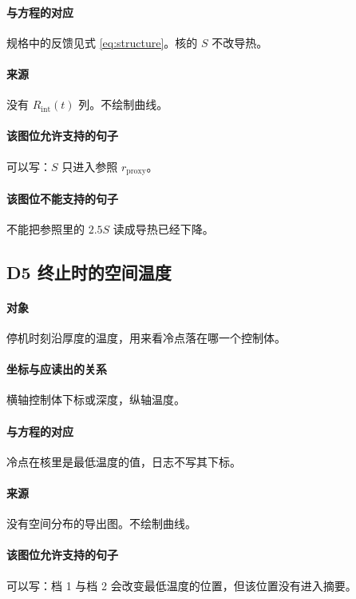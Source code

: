 \paragraph{与方程的对应}
规格中的反馈见式 \eqref{eq:structure}。核的 $S$ 不改导热。

\paragraph{来源}
没有 $R_{\mathrm{int}}(t)$ 列。不绘制曲线。

\paragraph{该图位允许支持的句子}
可以写：$S$ 只进入参照 $r_{\mathrm{proxy}}$。

\paragraph{该图位不能支持的句子}
不能把参照里的 $2.5S$ 读成导热已经下降。

\subsection{D5 终止时的空间温度}
\paragraph{对象}
停机时刻沿厚度的温度，用来看冷点落在哪一个控制体。

\paragraph{坐标与应读出的关系}
横轴控制体下标或深度，纵轴温度。

\paragraph{与方程的对应}
冷点在核里是最低温度的值，日志不写其下标。

\paragraph{来源}
没有空间分布的导出图。不绘制曲线。

\paragraph{该图位允许支持的句子}
可以写：档 1 与档 2 会改变最低温度的位置，但该位置没有进入摘要。

